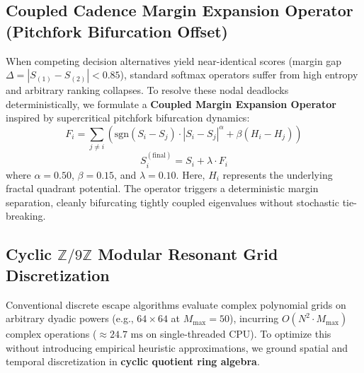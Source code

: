 \documentclass[10pt,journal,compsoc,twocolumn]{article}
\begin{document}
\subsection{Coupled Cadence Margin Expansion Operator (Pitchfork Bifurcation Offset)}
When competing decision alternatives yield near-identical scores (margin gap $\Delta = |S_{(1)} - S_{(2)}| < 0.85$), standard softmax operators suffer from high entropy and arbitrary ranking collapses. To resolve these nodal deadlocks deterministically, we formulate a \textbf{Coupled Margin Expansion Operator} inspired by supercritical pitchfork bifurcation dynamics:
\begin{equation}
F_i = \sum_{j \neq i} \left( \text{sgn}(S_i - S_j) \cdot |S_i - S_j|^\alpha + \beta (H_i - H_j) \right)
\end{equation}
\begin{equation}
S_i^{(\text{final})} = S_i + \lambda \cdot F_i
\end{equation}
where $\alpha = 0.50$, $\beta = 0.15$, and $\lambda = 0.10$. Here, $H_i$ represents the underlying fractal quadrant potential. The operator triggers a deterministic margin separation, cleanly bifurcating tightly coupled eigenvalues without stochastic tie-breaking.

\subsection{Cyclic $\mathbb{Z}/9\mathbb{Z}$ Modular Resonant Grid Discretization}
Conventional discrete escape algorithms evaluate complex polynomial grids on arbitrary dyadic powers (e.g., $64 \times 64$ at $M_{\max}=50$), incurring $O(N^2 \cdot M_{\max})$ complex operations ($\approx 24.7\text{ ms}$ on single-threaded CPU). To optimize this without introducing empirical heuristic approximations, we ground spatial and temporal discretization in \textbf{cyclic quotient ring algebra}.
\end{document}
